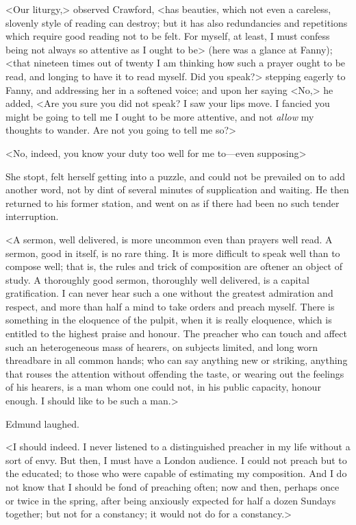 <Our liturgy,> observed Crawford, <has beauties, which not even a careless, slovenly style of reading can destroy; but it has also redundancies and repetitions which require good reading not to be felt. For myself, at least, I must confess being not always so attentive as I ought to be> (here was a glance at Fanny); <that nineteen times out of twenty I am thinking how such a prayer ought to be read, and longing to have it to read myself. Did you speak?> stepping eagerly to Fanny, and addressing her in a softened voice; and upon her saying <No,> he added, <Are you sure you did not speak? I saw your lips move. I fancied you might be going to tell me I ought to be more attentive, and not \textit{allow}  my thoughts to wander. Are not you going to tell me so?>

<No, indeed, you know your duty too well for me to—even supposing\longdash>

She stopt, felt herself getting into a puzzle, and could not be prevailed on to add another word, not by dint of several minutes of supplication and waiting. He then returned to his former station, and went on as if there had been no such tender interruption.

<A sermon, well delivered, is more uncommon even than prayers well read. A sermon, good in itself, is no rare thing. It is more difficult to speak well than to compose well; that is, the rules and trick of composition are oftener an object of study. A thoroughly good sermon, thoroughly well delivered, is a capital gratification. I can never hear such a one without the greatest admiration and respect, and more than half a mind to take orders and preach myself. There is something in the eloquence of the pulpit, when it is really eloquence, which is entitled to the highest praise and honour. The preacher who can touch and affect such an heterogeneous mass of hearers, on subjects limited, and long worn threadbare in all common hands; who can say anything new or striking, anything that rouses the attention without offending the taste, or wearing out the feelings of his hearers, is a man whom one could not, in his public capacity, honour enough. I should like to be such a man.>

Edmund laughed.

<I should indeed. I never listened to a distinguished preacher in my life without a sort of envy. But then, I must have a London audience. I could not preach but to the educated; to those who were capable of estimating my composition. And I do not know that I should be fond of preaching often; now and then, perhaps once or twice in the spring, after being anxiously expected for half a dozen Sundays together; but not for a constancy; it would not do for a constancy.>

